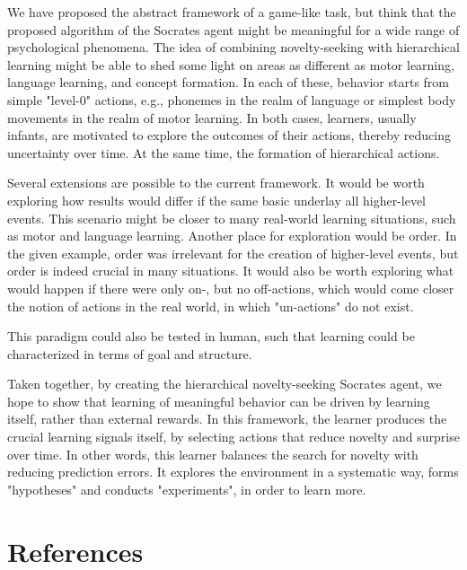 \documentclass{article}
\begin{document}
We have proposed the abstract framework of a game-like task, but think that the proposed algorithm of the Socrates agent might be meaningful for a wide range of psychological phenomena. The idea of combining novelty-seeking with hierarchical learning might be able to shed some light on areas as different as motor learning, language learning, and concept formation. In each of these, behavior starts from simple "level-0" actions, e.g., phonemes in the realm of language or simplest body movements in the realm of motor learning. In both cases, learners, usually infants, are motivated to explore the outcomes of their actions, thereby reducing uncertainty over time. At the same time, the formation of hierarchical actions. 

Several extensions are possible to the current framework. It would be worth exploring how results would differ if the same basic underlay all higher-level events. This scenario might be closer to many real-world learning situations, such as motor and language learning. Another place for exploration would be order. In the given example, order was irrelevant for the creation of higher-level events, but order is indeed crucial in many situations. It would also be worth exploring what would happen if there were only on-, but no off-actions, which would come closer the notion of actions in the real world, in which "un-actions" do not exist. 

This paradigm could also be tested in human, such that learning could be characterized in terms of goal and structure.

Taken together, by creating the hierarchical novelty-seeking Socrates agent, we hope to show that learning of meaningful behavior can be driven by learning itself, rather than external rewards. In this framework, the learner produces the crucial learning signals itself, by selecting actions that reduce novelty and surprise over time. In other words, this learner balances the search for novelty with reducing prediction errors. It explores the environment in a systematic way, forms "hypotheses" and conducts "experiments", in order to learn more. 

\section*{References}

\printbibliography
\end{document}
